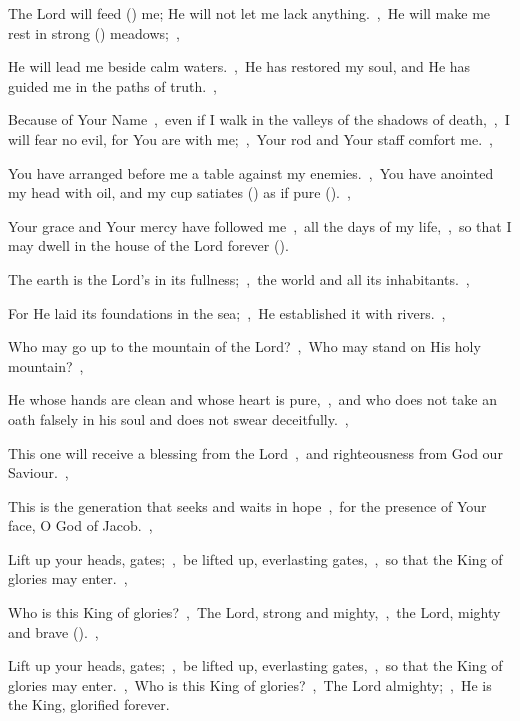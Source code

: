 \documentclass[12pt,twoside,a5paper]{article}
\begin{document}
\begin{normalparskip}
  The Lord will feed () me; He will not let me lack anything.~\sep\ He will make me rest in strong () meadows;~\sep


  He will lead me beside calm waters.~\sep\ He has restored my soul, and He has guided me in the paths of truth.~\sep

  Because of Your Name~\sep\ even if I walk in the valleys of the shadows of death,~\sep\ I will fear no evil, for You are with me;~\sep\ Your rod and Your staff comfort me.~\sep

  You have arranged before me a table against my enemies.~\sep\ You have anointed my head with oil, and my cup satiates () as if pure ().~\sep

  Your grace and Your mercy have followed me~\sep\ all the days of my life,~\sep\ so that I may dwell in the house of the Lord forever ().
\end{normalparskip}


\begin{normalparskip}
  The earth is the Lord's in its fullness;~\sep\ the world and all its inhabitants.~\sep


  For He laid its foundations in the sea;~\sep\ He established it with rivers.~\sep

  Who may go up to the mountain of the Lord?~\sep\ Who may stand on His holy mountain?~\sep

  He whose hands are clean and whose heart is pure,~\sep\ and who does not take an oath falsely in his soul and does not swear deceitfully.~\sep

  This one will receive a blessing from the Lord~\sep\ and righteousness from God our Saviour.~\sep

  This is the generation that seeks and waits in hope~\sep\ for the presence of Your face, O God of Jacob.~\sep

  Lift up your heads, gates;~\sep\ be lifted up, everlasting gates,~\sep\ so that the King of glories may enter.~\sep

  Who is this King of glories?~\sep\ The Lord, strong and mighty,~\sep\ the Lord, mighty and brave ().~\sep

  Lift up your heads, gates;~\sep\ be lifted up, everlasting gates,~\sep\ so that the King of glories may enter.~\sep\ Who is this King of glories?~\sep\ The Lord almighty;~\sep\ He is the King, glorified forever.
\end{normalparskip}
\end{document}
